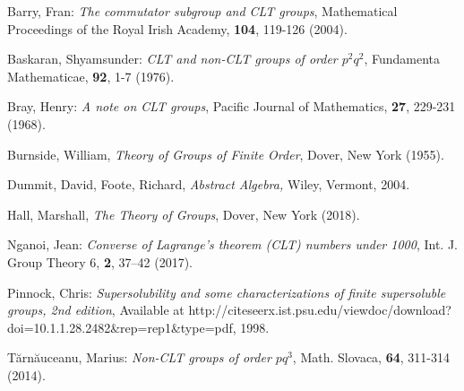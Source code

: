 \documentclass[12pt]{report}
\theoremstyle{newthm}
\begin{document}
\begin{thebibliography}{50}  
 Barry, Fran: \textit{The commutator subgroup and CLT groups}, Mathematical Proceedings of the Royal Irish Academy, \textbf{104}, 119-126 (2004).

 Baskaran, Shyamsunder: \textit{CLT and non-CLT groups of order $p^2q^2$}, Fundamenta Mathematicae, \textbf{92}, 1-7 (1976).

 Bray, Henry: \textit{A note on CLT groups}, Pacific Journal of Mathematics, \textbf{27}, 229-231 (1968).

 Burnside, William, \emph{Theory of Groups of Finite Order}, Dover, New York (1955).

 Dummit, David, Foote, Richard, \emph{Abstract Algebra,} Wiley, Vermont, 2004.

 Hall, Marshall, \emph{The Theory of Groups}, Dover, New York (2018). 

 Nganoi, Jean: \textit{Converse of Lagrange's theorem (CLT) numbers under 1000}, Int. J. Group Theory 6, \textbf{2}, 37–42 (2017).

 Pinnock, Chris: \textit{Supersolubility and some characterizations of finite supersoluble groups, 2nd edition}, Available at http://citeseerx.ist.psu.edu/viewdoc/download?doi=10.1.1.28.2482&rep=rep1&type=pdf, 1998.

 T\u arn\u auceanu, Marius: \textit{Non-CLT groups of order $pq^3$}, Math. Slovaca, \textbf{64}, 311-314 (2014).


\end{thebibliography}
\end{document}
